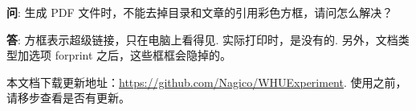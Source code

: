 \textbf{问}: {\kaishu 生成 PDF 文件时，不能去掉目录和文章的引用彩色方框，请问怎么解决？}

\textbf{答}: {\kaishu 方框表示超级链接，只在电脑上看得见. 实际打印时，是没有的. 另外，文档类型加选项 forprint 之后，这些框框会隐掉的。}

 \vfill

本文档下载更新地址：\url{https://github.com/Nagico/WHUExperiment}. 使用之前，请移步查看是否有更新。